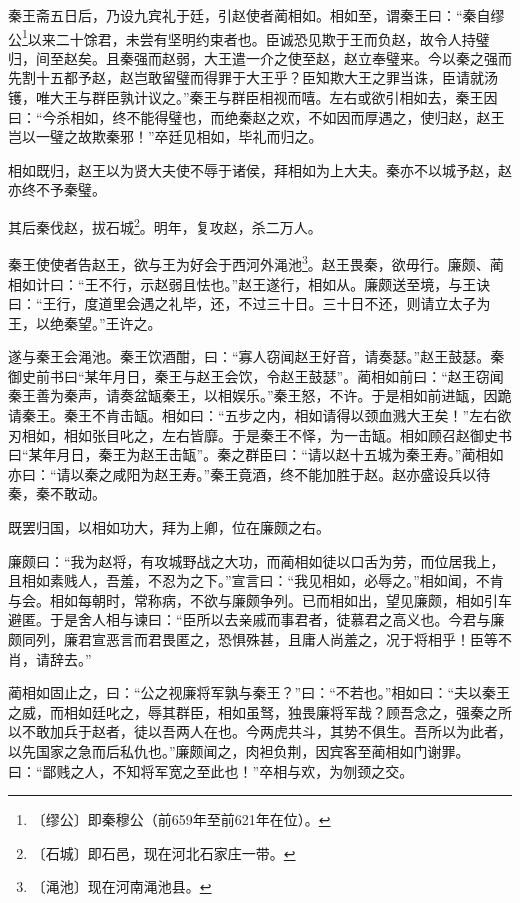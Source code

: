 \documentclass[12pt,UTF-8,openany,a4]{ctexbook}
\begin{document}
\begin{large}
    秦王斋五日后，乃设九宾礼于廷，引赵使者蔺相如。相如至，谓秦王曰：“秦自缪公\footnote{〔缪公〕\yiwen 即秦穆公（前659年至前621年在位）。}以来二十馀君，未尝有坚明约束者也。臣诚恐见欺于王而负赵，故令人持璧归，间至赵矣。且秦强而赵弱，大王遣一介之使至赵，赵立奉璧来。今以秦之强而先割十五都予赵，赵岂敢留璧而得罪于大王乎？臣知欺大王之罪当诛，臣请就汤镬，唯大王与群臣孰计议之。”秦王与群臣相视而嘻。左右或欲引相如去，秦王因曰：“今杀相如，终不能得璧也，而绝秦赵之欢，不如因而厚遇之，使归赵，赵王岂以一璧之故欺秦邪！”卒廷见相如，毕礼而归之。
    
    相如既归，赵王以为贤大夫使不辱于诸侯，拜相如为上大夫。秦亦不以城予赵，赵亦终不予秦璧。
    
    其后秦伐赵，拔石城\footnote{〔石城〕\yiwen 即石邑，现在河北石家庄一带。}。明年，复攻赵，杀二万人。
    
    秦王使使者告赵王，欲与王为好会于西河外渑池\footnote{〔渑池〕\yiwen 现在河南渑池县。}。赵王畏秦，欲毋行。廉颇、蔺相如计曰：“王不行，示赵弱且怯也。”赵王遂行，相如从。廉颇送至境，与王诀曰：“王行，度道里会遇之礼毕，还，不过三十日。三十日不还，则请立太子为王，以绝秦望。”王许之。
    
    遂与秦王会渑池。秦王饮酒酣，曰：“寡人窃闻赵王好音，请奏瑟。”赵王鼓瑟。秦御史前书曰“某年月日，秦王与赵王会饮，令赵王鼓瑟”。蔺相如前曰：“赵王窃闻秦王善为秦声，请奏盆缻秦王，以相娱乐。”秦王怒，不许。于是相如前进缻，因跪请秦王。秦王不肯击缻。相如曰：“五步之内，相如请得以颈血溅大王矣！”左右欲刃相如，相如张目叱之，左右皆靡。于是秦王不怿，为一击缻。相如顾召赵御史书曰“某年月日，秦王为赵王击缻”。秦之群臣曰：“请以赵十五城为秦王寿。”蔺相如亦曰：“请以秦之咸阳为赵王寿。”秦王竟酒，终不能加胜于赵。赵亦盛设兵以待秦，秦不敢动。
    
    既罢归国，以相如功大，拜为上卿，位在廉颇之右。
    
    廉颇曰：“我为赵将，有攻城野战之大功，而蔺相如徒以口舌为劳，而位居我上，且相如素贱人，吾羞，不忍为之下。”宣言曰：“我见相如，必辱之。”相如闻，不肯与会。相如每朝时，常称病，不欲与廉颇争列。已而相如出，望见廉颇，相如引车避匿。于是舍人相与谏曰：“臣所以去亲戚而事君者，徒慕君之高义也。今君与廉颇同列，廉君宣恶言而君畏匿之，恐惧殊甚，且庸人尚羞之，况于将相乎！臣等不肖，请辞去。”
    
    蔺相如固止之，曰：“公之视廉将军孰与秦王？”曰：“不若也。”相如曰：“夫以秦王之威，而相如廷叱之，辱其群臣，相如虽驽，独畏廉将军哉？顾吾念之，强秦之所以不敢加兵于赵者，徒以吾两人在也。今两虎共斗，其势不俱生。吾所以为此者，以先国家之急而后私仇也。”廉颇闻之，肉袒负荆，因宾客至蔺相如门谢罪。曰：“鄙贱之人，不知将军宽之至此也！”卒相与欢，为刎颈之交。
\end{large}
\end{document}
